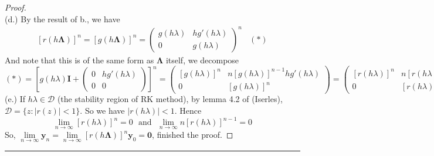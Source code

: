\documentclass[a4paper, 10pt]{article}
\theoremstyle{definition}
\theoremstyle{hSol}
\begin{document}
\begin{proof}
~\\
(d.) By the result of b., we have
\begin{equation}
  \begin{split}
    [r(h \bm{\Lambda})]^n = [g(h \bm{\Lambda})]^n = \begin{pmatrix}
    g(h \lambda) & h g'(h \lambda) \\
    0 & g(h \lambda)
  \end{pmatrix}^n~~~~(*)
  \end{split}
\end{equation}
And note that this is of the same form as $\bm{\Lambda}$ itself, we decompose
\begin{equation}
  (*) = \left[g(h \lambda) \bm{I} + \begin{pmatrix}
  0 & h g'(h \lambda) \\
  0 & 0
\end{pmatrix}\right]^n = 
\begin{pmatrix}
  [g(h \lambda)]^n & n [g(h \lambda)]^{n-1}h g'(h \lambda) \\
  0 & [g(h \lambda)]^n
\end{pmatrix}
=
\begin{pmatrix}
  [r(h \lambda)]^n & n [r(h \lambda)]^{n-1}h r'(h \lambda) \\
  0 & [r(h \lambda)]^n
\end{pmatrix}~~~~\square
\end{equation}
(e.) If $h \lambda \in \mathcal{D}$ (the stability region of RK method), by lemma 4.2 of (Iserles), $\mathcal{D}=\{z: |r(z)|<1\}$. So we have $|r(h \lambda) |<1$. Hence 
$$
\lim\limits_{n\rightarrow\infty} [r(h\lambda)]^n = 0~~~\text{and}~~~\lim\limits_{n\rightarrow\infty} n [r(h \lambda)]^{n-1} = 0
$$
So, $\lim\limits_{n\rightarrow\infty}\bm{y}_n = \lim\limits_{n\rightarrow\infty} [r(h \bm{\Lambda})]^n \bm{y}_0 = \bm{0}$, finished the proof.
\end{proof} 
\noindent\rule{16cm}{0.4pt}
\end{document}

